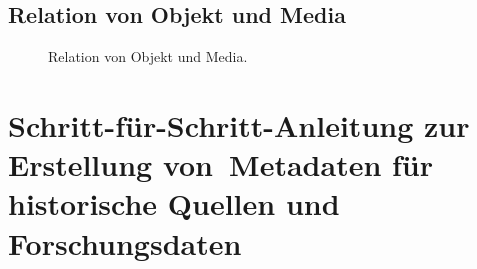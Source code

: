 \documentclass[
  letterpaper,
  DIV=11,
  numbers=noendperiod,
  landscape,
  a4paper,
  geometry:margin=1in]{scrartcl}
\begin{document}
\subsection{Relation von Objekt und
Media}\label{relation-von-objekt-und-media}

\begin{figure}


\caption{\label{fig-metadata-5}Relation von Objekt und Media.}

\end{figure}%

\section{Schritt-für-Schritt-Anleitung zur Erstellung von~Metadaten für
historische Quellen und
Forschungsdaten}\label{sec-Schritt-fuxfcr-Schritt-Anleitung}
\end{document}
